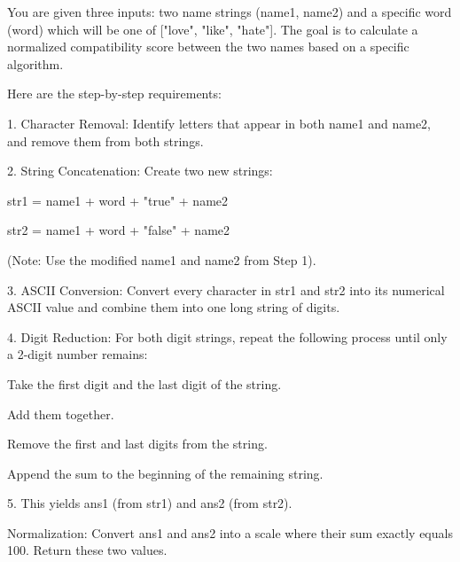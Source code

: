 You are given three inputs: two name strings (name1, name2) and a specific word (word) which will be one of ["love", "like", "hate"]. The goal is to calculate a normalized compatibility score between the two names based on a specific algorithm.

Here are the step-by-step requirements:

1. Character Removal: Identify letters that appear in both name1 and name2, and remove them from both strings.

2. String Concatenation: Create two new strings:

    str1 = name1 + word + "true" + name2

    str2 = name1 + word + "false" + name2

   (Note: Use the modified name1 and name2 from Step 1).

3. ASCII Conversion: Convert every character in str1 and str2 into its numerical ASCII value and combine them into one long string of digits.

4. Digit Reduction: For both digit strings, repeat the following process until only a 2-digit number remains:

    Take the first digit and the last digit of the string.

    Add them together.

    Remove the first and last digits from the string.

    Append the sum to the beginning of the remaining string.

5. This yields ans1 (from str1) and ans2 (from str2).

Normalization: Convert ans1 and ans2 into a scale where their sum exactly equals 100. Return these two values.